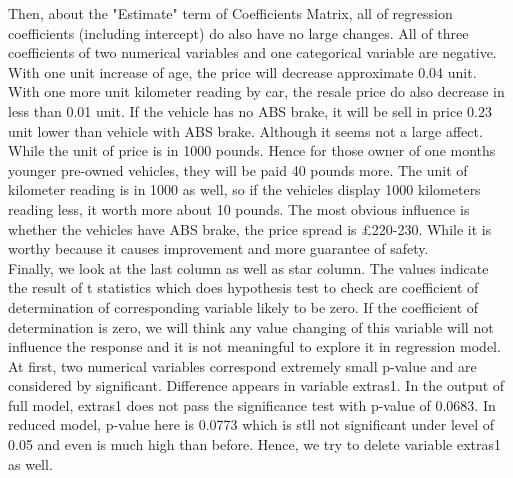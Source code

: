 \documentclass[a4paper]{article}
\begin{document}
\noindent
Then, about the "Estimate" term of Coefficients Matrix, all of regression coefficients (including intercept) do also have no large changes. All of three coefficients of two numerical variables and one categorical variable are negative. With one unit increase of age, the price will decrease approximate 0.04 unit. With one more unit kilometer reading by car, the resale price do also decrease in less than 0.01 unit. If the vehicle has no ABS brake, it will be sell in price 0.23 unit lower than vehicle with ABS brake. Although it seems not a large affect. While the unit of price is in 1000 pounds. Hence for those owner of one months younger pre-owned vehicles, they will be paid 40 pounds more. The unit of kilometer reading is in 1000 as well, so if the vehicles display 1000 kilometers reading less, it worth more about 10 pounds. The most obvious influence is whether the vehicles have ABS brake, the price spread is \pounds 220-230. While it is worthy because it causes improvement and more guarantee of safety.\\

\noindent
Finally, we look at the last column as well as star column. The values indicate the result of t statistics which does hypothesis test to check are coefficient of determination of corresponding variable likely to be zero. If the coefficient of determination is zero, we will think any value changing of this variable will not influence the response and it is not meaningful to explore it in regression model. At first, two numerical variables correspond extremely small p-value and are considered by significant. Difference appears in variable extras1. In the output of full model, extras1 does not pass the significance test with p-value of 0.0683. In reduced model, p-value here is 0.0773 which is stll not significant under level of 0.05 and even is much high than before. Hence, we try to delete variable extras1 as well.
\end{document}
